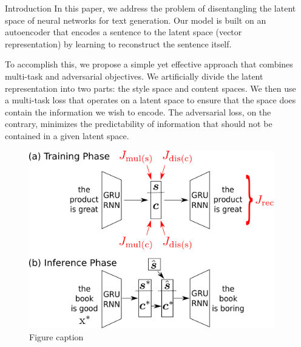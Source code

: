 \documentclass[final]{beamer}
\newlength{\sepwid}
\newlength{\onecolwid}
\begin{document}
\begin{frame}[t]
\begin{columns}[t]
\begin{column}{\onecolwid}
\begin{block}{Introduction}
                In this paper, we address the problem of disentangling the latent space of neural networks for text generation.
                Our model is built on an autoencoder that encodes a sentence to the latent space (vector representation) by learning to reconstruct the sentence itself.

                To accomplish this, we propose a simple yet effective approach that combines multi-task and adversarial objectives.
                We artificially divide the latent representation into two parts: the style space and content spaces.
                We then use a multi-task loss that operates on a latent space to ensure that the space does contain the information we wish to encode.
                The adversarial loss, on the contrary, minimizes the predictability of information that should not be contained in a given latent space.

            \end{block}


            \begin{figure}
                \includegraphics[width=1\linewidth]{model-overview}
                \caption{Figure caption}
            \end{figure}


        \end{column} %

        \begin{column}{\sepwid}\end{column} %


\end{columns}
\end{frame}
\end{document}
